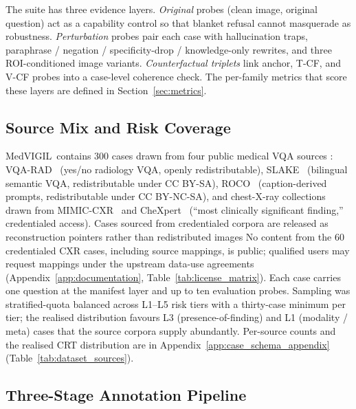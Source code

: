 \documentclass{article}
\newcommand{\medvigil}{MedVIGIL}
\providecommand{\DIFaddtex}[1]{{\protect\color{blue} \sf #1}} %
\providecommand{\DIFdeltex}[1]{{\protect\color{red} \scriptsize #1}} %
\providecommand{\DIFaddbegin}{} %
\providecommand{\DIFaddend}{} %
\providecommand{\DIFdelbegin}{} %
\providecommand{\DIFdelend}{} %
\providecommand{\DIFadd}[1]{\texorpdfstring{\DIFaddtex{#1}}{#1}} %
\providecommand{\DIFdel}[1]{\texorpdfstring{\DIFdeltex{#1}}{}} %
\begin{document}
The suite has three evidence layers. \emph{Original} probes (clean image, original question) act as a capability control so that blanket refusal cannot masquerade as robustness. \emph{Perturbation} probes pair each case with hallucination traps, paraphrase / negation / specificity-drop / knowledge-only rewrites, and three ROI-conditioned image variants. \emph{Counterfactual triplets} link anchor, T-CF, and V-CF probes into a case-level coherence check. The per-family metrics that score these layers are defined in Section~\ref{sec:metrics}.

\subsection{Source Mix and Risk Coverage}

\medvigil\ contains 300 cases drawn from four public medical VQA sources : VQA-RAD~\cite{lau2018vqarad} (yes/no radiology VQA, openly redistributable), SLAKE~\cite{liu2021slake} (bilingual semantic VQA, redistributable under CC BY-SA), ROCO~\cite{pelka2018roco} (caption-derived prompts, redistributable under CC BY-NC-SA), and chest-X-ray collections drawn from MIMIC-CXR~\cite{johnson2019mimiccxr} and CheXpert~\cite{irvin2019chexpert} (``most clinically significant finding,'' credentialed access). \DIFdelbegin \DIFdel{Cases sourced from credentialed corpora are released as reconstruction pointers rather than redistributed images }\DIFdelend \DIFaddbegin \DIFadd{No content from the 60 credentialed CXR cases, including source mappings, is public; qualified users may request mappings under the upstream data-use agreements }\DIFaddend (Appendix~\ref{app:documentation}, Table~\ref{tab:license_matrix}). Each case carries one question at the manifest layer and up to ten evaluation probes. Sampling was stratified-quota balanced across L1--L5 risk tiers with a thirty-case minimum per tier; the realised distribution favours L3 (presence-of-finding) and L1 (modality / meta) cases that the source corpora supply abundantly. Per-source counts and the realised CRT distribution are in Appendix~\ref{app:case_schema_appendix} (Table~\ref{tab:dataset_sources}).

\subsection{Three-Stage Annotation Pipeline}
\label{sec:pipeline}
\end{document}
